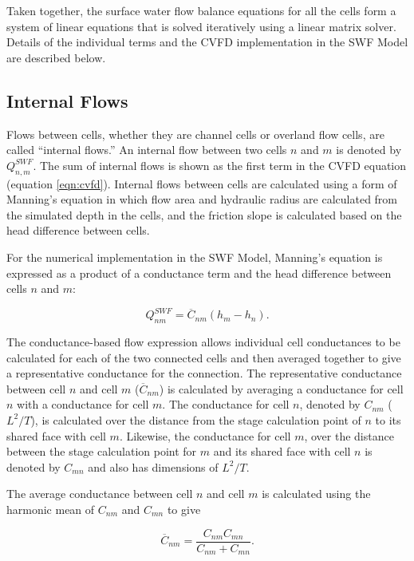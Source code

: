 \documentclass[fleqn]{article}
\begin{document}
Taken together, the surface water flow balance equations for all the cells form a system of linear equations that is solved iteratively using a linear matrix solver. Details of the individual terms and the CVFD implementation in the SWF Model are described below.

\subsection{Internal Flows}
Flows between cells, whether they are channel cells or overland flow cells, are called ``internal flows.'' An internal flow between two cells $n$ and $m$ is denoted by $Q_{n,m}^{SWF}$.  The sum of internal flows is shown as the first term in the CVFD equation (equation \ref{eqn:cvfd}).  Internal flows between cells are calculated using a form of Manning's equation in which flow area and hydraulic radius are calculated from the simulated depth in the cells, and the friction slope is calculated based on the head difference between cells.  

For the numerical implementation in the SWF Model, Manning's equation is expressed as a product of a conductance term and the head difference between cells $n$ and $m$:

\begin{equation}
  Q_{nm}^{SWF} = \overline{C}_{nm} \left ( h_m - h_n \right ).
\end{equation}

\noindent The conductance-based flow expression allows individual cell conductances to be calculated for each of the two connected cells and then averaged together to give a representative conductance for the connection.  The representative conductance between cell $n$ and cell $m$ ($\overline{C}_{nm}$) is calculated by averaging a conductance for cell $n$ with a conductance for cell $m$.  The conductance for cell $n$, denoted by $C_{nm}$ ($L^2/T$), is calculated over the distance from the stage calculation point of $n$ to its shared face with cell $m$.  Likewise, the conductance for cell $m$, over the distance between the stage calculation point for $m$ and its shared face with cell $n$ is denoted by $C_{mn}$ and also has dimensions of $L^2/T$.

The average conductance between cell $n$ and cell $m$ is calculated using the harmonic mean of $C_{nm}$ and $C_{mn}$ to give

\begin{equation}
  \overline{C}_{nm} = \frac{C_{nm}  C_{mn}}{C_{nm} + C_{mn}}.
\end{equation}
\end{document}
